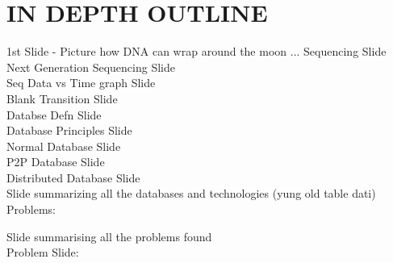 \documentclass{article}
\begin{document}
\section{IN DEPTH OUTLINE}
1st Slide - Picture how DNA can wrap around the moon
...
Sequencing Slide \\
    
Next Generation Sequencing Slide \\

Seq Data vs Time graph Slide \\

Blank Transition Slide \\
Databse Defn Slide \\
Database Principles Slide \\
Normal Database Slide \\
P2P Database Slide \\

Distributed Database Slide \\

Slide summarizing all the databases and technologies (yung old table dati) \\
    Problems: %

Slide summarising all the problems found \\

Problem Slide:\\

    
\end{document}
